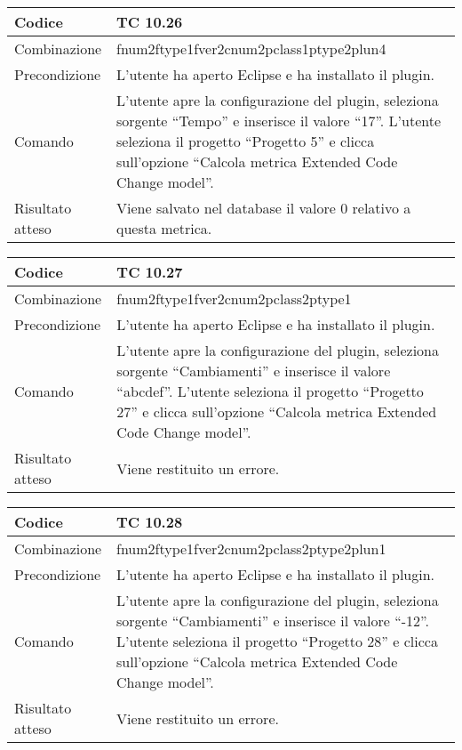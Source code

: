 \begin{table}[ht]
\begin{tabular}{|p{3cm}|p{9cm}|}
\hline
\cellcolor{lightgray}Codice				& TC 10.26								\\
\hline
\cellcolor{lightgray}Combinazione		& fnum2ftype1fver2cnum2pclass1ptype2plun4									\\
\hline
\cellcolor{lightgray}Precondizione		& L'utente ha aperto Eclipse e ha installato il plugin.		\\
\hline
\cellcolor{lightgray}Comando			& L'utente apre la configurazione del plugin, seleziona sorgente ``Tempo'' e inserisce il valore ``17''. L'utente seleziona il progetto ``Progetto 5''  e clicca sull'opzione ``Calcola metrica Extended Code Change model''.	\\
\hline
\cellcolor{lightgray}Risultato atteso	& Viene salvato nel database il valore 0 relativo a questa metrica.\\
\hline
\end{tabular}
\end{table}

\begin{table}[ht]
\begin{tabular}{|p{3cm}|p{9cm}|}
\hline
\cellcolor{lightgray}Codice				& TC 10.27								\\
\hline
\cellcolor{lightgray}Combinazione		& fnum2ftype1fver2cnum2pclass2ptype1									\\
\hline
\cellcolor{lightgray}Precondizione		& L'utente ha aperto Eclipse e ha installato il plugin.		\\
\hline
\cellcolor{lightgray}Comando			& L'utente apre la configurazione del plugin, seleziona sorgente ``Cambiamenti'' e inserisce il valore ``abcdef''.  L'utente seleziona il progetto ``Progetto 27''  e clicca sull'opzione ``Calcola metrica Extended Code Change model''.	\\
\hline
\cellcolor{lightgray}Risultato atteso	& Viene restituito un errore.\\
\hline
\end{tabular}
\end{table}

\begin{table}[ht]
\begin{tabular}{|p{3cm}|p{9cm}|}
\hline
\cellcolor{lightgray}Codice				& TC 10.28								\\
\hline
\cellcolor{lightgray}Combinazione		& fnum2ftype1fver2cnum2pclass2ptype2plun1									\\
\hline
\cellcolor{lightgray}Precondizione		& L'utente ha aperto Eclipse e ha installato il plugin.		\\
\hline
\cellcolor{lightgray}Comando			& L'utente apre la configurazione del plugin, seleziona sorgente ``Cambiamenti'' e inserisce il valore ``-12''. L'utente seleziona il progetto ``Progetto 28''  e clicca sull'opzione ``Calcola metrica Extended Code Change model''.	\\
\hline
\cellcolor{lightgray}Risultato atteso	& Viene restituito un errore.\\
\hline
\end{tabular}
\end{table}

